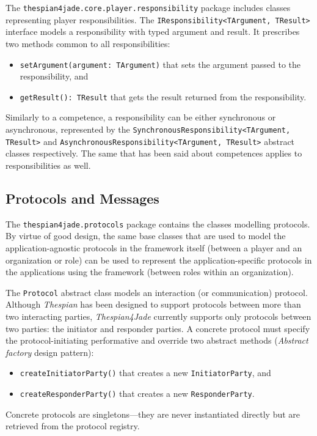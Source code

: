 The \texttt{thespian4jade.core.player.responsibility} package includes classes representing player responsibilities.
The \texttt{IResponsibility<TArgument, TResult>} interface models a responsibility with typed argument and result.
It prescribes two methods common to all responsibilities:
\begin{itemize}
	\item \texttt{setArgument(argument: TArgument)} that sets the argument passed to the responsibility, and
	\item \texttt{getResult(): TResult} that gets the result returned from the responsibility.
\end{itemize}

Similarly to a competence, a responsibility can be either synchronous or asynchronous, represented by the \texttt{SynchronousResponsibility<TArgument, TResult>} and \texttt{AsynchronousResponsibility<TArgument, TResult>} abstract classes respectively.
The same that has been said about competences applies to responsibilities as well.

\subsection{Protocols and Messages}

The \texttt{thespian4jade.protocols} package contains the classes modelling protocols.
By virtue of good design, the same base classes that are used to model the application-agnostic protocols in the framework itself (between a player and an organization or role) can be used to represent the application-specific protocols in the applications using the framework (between roles within an organization). 

The \texttt{Protocol} abstract class models an interaction (or communication) protocol.
Although \textit{Thespian} has been designed to support protocols between more than two interacting parties, \textit{Thespian4Jade} currently supports only protocols between two parties: the initiator and responder parties.
A concrete protocol must specify the protocol-initiating performative and override two abstract methods (\textit{Abstract factory} design pattern):
\begin{itemize}
	\item \texttt{createInitiatorParty()} that creates a new \texttt{InitiatorParty}, and
	\item \texttt{createResponderParty()} that creates a new \texttt{ResponderParty}.
\end{itemize}
Concrete protocols are singletons---they are never instantiated directly but are retrieved from the protocol registry.

